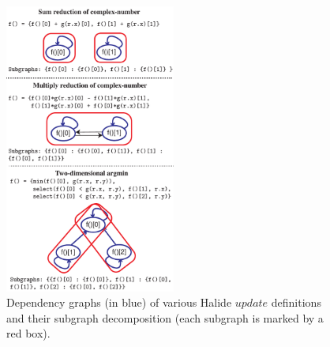

\begin{figure}
\centering
\includegraphics[width=0.5\textwidth]{subgraphs}
\caption{Dependency graphs (in blue) of various Halide $update$ definitions and their subgraph decomposition (each subgraph is marked by a red box).}
\label{fig:subgraphs}
\end{figure}

